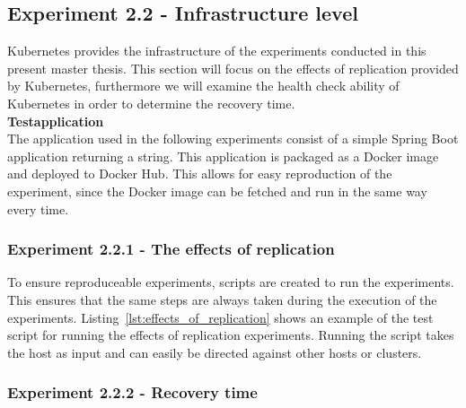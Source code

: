 
\subsection*{Experiment 2.2 - Infrastructure level}

Kubernetes provides the infrastructure of the experiments conducted in this present master thesis. This section will focus on the effects of replication provided by Kubernetes, furthermore we will examine the health check ability of Kubernetes in order to determine the recovery time. \\

\noindent\textbf{Testapplication} \\
The application used in the following experiments consist of a simple Spring Boot application returning a string. This application is packaged as a Docker image and deployed to Docker Hub. This allows for easy reproduction of the experiment, since the Docker image can be fetched and run in the same way every time.


\subsubsection*{Experiment 2.2.1 - The effects of replication}

To ensure reproduceable experiments, scripts are created to run the experiments. This ensures that the same steps are always taken during the execution of the experiments. Listing~\ref{lst:effects_of_replication} shows an example of the test script for running the effects of replication experiments. Running the script takes the host as input and can easily be directed against other hosts or clusters.




\subsubsection*{Experiment 2.2.2 - Recovery time} 

